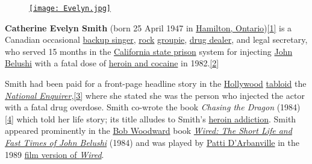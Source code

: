 \documentclass[12pt,a4paper]{scrartcl}
\newenvironment{ajanlofig}{\begin{figure}\begin{center}}{
\end{center}\end{figure}}
\begin{document}
\begin{ajanlo}

\begin{ajanlofig}

\href{https://en.wikipedia.org/wiki/Cathy_Smith}{\texttt{[image: Evelyn.jpg]}}

\end{ajanlofig}

\textbf{Catherine Evelyn Smith} (born 25 April 1947 in
\href{https://en.wikipedia.org/wiki/Hamilton,_Ontario}{Hamilton,
Ontario})\href{https://en.wikipedia.org/wiki/Cathy_Smith\#cite_note-CESMITH1-1}{{[}1{]}}
is a Canadian occasional
\href{https://en.wikipedia.org/wiki/Backup_singer}{backup singer},
\href{https://en.wikipedia.org/wiki/Rock_music}{rock}
\href{https://en.wikipedia.org/wiki/Groupie}{groupie},
\href{https://en.wikipedia.org/wiki/Drug_dealer}{drug dealer}, and legal
secretary, who served 15 months in the
\href{https://en.wikipedia.org/wiki/California_Institution_for_Women}{California
state prison} system for injecting
\href{https://en.wikipedia.org/wiki/John_Belushi}{John Belushi} with a
fatal dose of
\href{https://en.wikipedia.org/wiki/Speedball_(drug)}{heroin and
cocaine} in
1982.\href{https://en.wikipedia.org/wiki/Cathy_Smith\#cite_note-2}{{[}2{]}}

Smith had been paid for a front-page headline story in the
\href{https://en.wikipedia.org/wiki/Hollywood}{Hollywood}
\href{https://en.wikipedia.org/wiki/Tabloid_(newspaper_format)}{tabloid}
the
\emph{\href{https://en.wikipedia.org/wiki/National_Enquirer}{National
Enquirer}},\href{https://en.wikipedia.org/wiki/Cathy_Smith\#cite_note-CESMITH4-3}{{[}3{]}}
where she stated she was the person who injected the actor with a fatal
drug overdose. Smith co-wrote the book \emph{Chasing the Dragon}
(1984)\href{https://en.wikipedia.org/wiki/Cathy_Smith\#cite_note-CESMITH17-4}{{[}4{]}}
which told her life story; its title alludes to Smith's
\href{https://en.wikipedia.org/wiki/Heroin_addiction}{heroin addiction}.
Smith appeared prominently in the
\href{https://en.wikipedia.org/wiki/Bob_Woodward}{Bob Woodward} book
\emph{\href{https://en.wikipedia.org/wiki/Wired_(book)}{Wired: The Short
Life and Fast Times of John Belushi}} (1984) and was played by
\href{https://en.wikipedia.org/wiki/Patti_D\%27Arbanville}{Patti
D'Arbanville} in the 1989
\href{https://en.wikipedia.org/wiki/Wired_(film)}{film version of
\emph{Wired}}.

\end{ajanlo}
\end{document}

